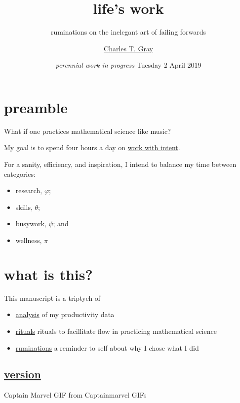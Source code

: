 \documentclass[]{book}
\title{life's work}
\subtitle{ruminations on the inelegant art of failing forwards}
\author{\href{http://cantabile.rbind.io/about.html}{Charles T. Gray}}
\date{\emph{perennial work in progress} Tuesday 2 April 2019}
\providecommand{\tightlist}{%
  \setlength{\itemsep}{0pt}\setlength{\parskip}{0pt}}
\begin{document}
\maketitle

{
\setcounter{tocdepth}{1}
\tableofcontents
}
\hypertarget{preamble}{%
\chapter{preamble}\label{preamble}}

What if one practices mathematical science like music?

My goal is to spend four hours a day on \protect\hyperlink{work-with-intent}{work with intent}.

For a sanity, efficiency, and inspiration, I intend to balance my time between categories:

\begin{itemize}
\tightlist
\item
  research, \(\varphi\);
\item
  skills, \(\theta\);\\
\item
  busywork, \(\psi\); and
\item
  wellness, \(\pi\)
\end{itemize}

\hypertarget{what-is-this}{%
\chapter{what is this?}\label{what-is-this}}

This manuscript is a triptych of

\begin{itemize}
\tightlist
\item
  \protect\hyperlink{analysis}{analysis} of my productivity data
\item
  \protect\hyperlink{rituals}{rituals} rituals to facillitate flow in practicing mathematical science
\item
  \protect\hyperlink{ruminations}{ruminations} a reminder to self about why I chose what I did
\end{itemize}

\hypertarget{version}{%
\section{\texorpdfstring{\protect\hyperlink{mindfulness}{version}}{version}}\label{version}}

Captain Marvel GIF from Captainmarvel GIFs
\end{document}
